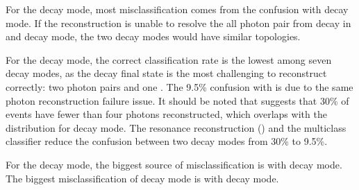 

For the \decayRhoShortest decay mode, most misclassification comes from the confusion with \decayAiPhotonShortest decay mode.  If the reconstruction is unable to resolve the all photon pair from \Ppizero decay in \decayRhoShortest and \decayAiPhotonShortest decay mode, the two decay modes would have similar topologies.

For the \decayAiPhotonShortest decay mode, the correct classification rate is the lowest among seven decay modes, as the \decayAiPhotonShortest decay final state is the most challenging to reconstruct correctly: two photon pairs and  one \Ppipm. The 9.5\% confusion with \decayRhoShortest is due to the same photon reconstruction failure issue. It should be noted that  suggests that 30\% of \decayAiPhotonShortest events have fewer than four photons reconstructed, which overlaps with the distribution for \decayRhoShortest decay mode. The \decayAiPhotonShortest resonance reconstruction () and the multiclass classifier reduce the confusion between two decay modes from 30\% to  9.5\%.

For the \decayAiPionShortest decay mode, the biggest source of misclassification is with \decayThreePionPhotonShort decay mode. The biggest misclassification of  \decayThreePionPhotonShort decay mode  is with \decayAiPionShortest decay mode.




